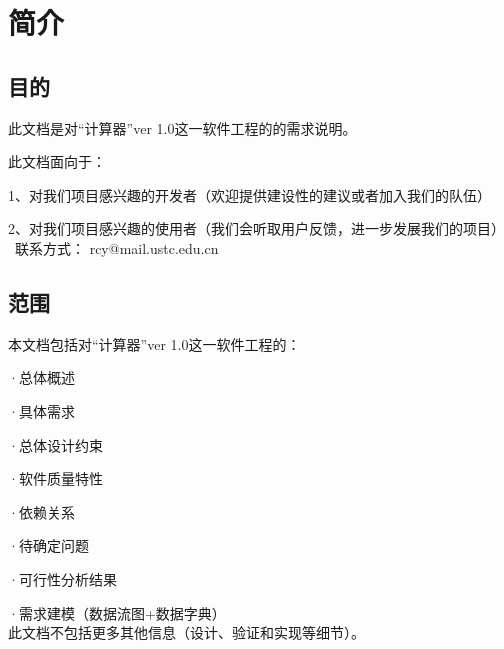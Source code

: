 \chapter{简介}




\section{目的}
此文档是对“计算器”ver 1.0这一软件工程的的需求说明。

此文档面向于：


1、对我们项目感兴趣的开发者（欢迎提供建设性的建议或者加入我们的队伍）

2、对我们项目感兴趣的使用者（我们会听取用户反馈，进一步发展我们的项目）\\

 联系方式：
 rcy@mail.ustc.edu.cn


\section{范围}
本文档包括对“计算器”ver 1.0这一软件工程的：

·总体概述

·具体需求

·总体设计约束

·软件质量特性

·依赖关系

·待确定问题

·可行性分析结果

·需求建模（数据流图+数据字典）\\

此文档不包括更多其他信息（设计、验证和实现等细节）。